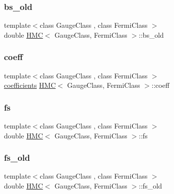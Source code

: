 \subsubsection{\texorpdfstring{bs\+\_\+old}{bs\_old}}
{\footnotesize\ttfamily template$<$class Gauge\+Class , class Fermi\+Class $>$ \\
double \hyperlink{class_h_m_c}{H\+MC}$<$ Gauge\+Class, Fermi\+Class $>$\+::bs\+\_\+old}

\mbox{\label{class_h_m_c_aa7a373acc998a08fcdc2e86dc6084b7b}} 
\subsubsection{\texorpdfstring{coeff}{coeff}}
{\footnotesize\ttfamily template$<$class Gauge\+Class , class Fermi\+Class $>$ \\
\hyperlink{classcoefficients}{coefficients} \hyperlink{class_h_m_c}{H\+MC}$<$ Gauge\+Class, Fermi\+Class $>$\+::coeff}

\mbox{\label{class_h_m_c_ae7be326ed9dadc4876de7f60dd683e37}} 
\subsubsection{\texorpdfstring{fs}{fs}}
{\footnotesize\ttfamily template$<$class Gauge\+Class , class Fermi\+Class $>$ \\
double \hyperlink{class_h_m_c}{H\+MC}$<$ Gauge\+Class, Fermi\+Class $>$\+::fs}

\mbox{\label{class_h_m_c_a4f80874711a6599cb8c579dda6e088fb}} 
\subsubsection{\texorpdfstring{fs\+\_\+old}{fs\_old}}
{\footnotesize\ttfamily template$<$class Gauge\+Class , class Fermi\+Class $>$ \\
double \hyperlink{class_h_m_c}{H\+MC}$<$ Gauge\+Class, Fermi\+Class $>$\+::fs\+\_\+old}

\mbox{\label{class_h_m_c_a5fe0965bb8e3d1220f60979189e86357}} 
